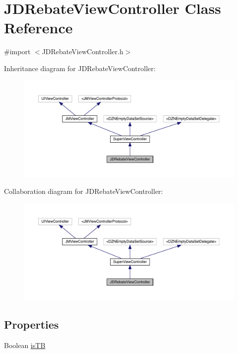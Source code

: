 \hypertarget{interface_j_d_rebate_view_controller}{}\section{J\+D\+Rebate\+View\+Controller Class Reference}
\label{interface_j_d_rebate_view_controller}


{\ttfamily \#import $<$J\+D\+Rebate\+View\+Controller.\+h$>$}



Inheritance diagram for J\+D\+Rebate\+View\+Controller\+:\nopagebreak
\begin{figure}[H]
\begin{center}
\leavevmode
\includegraphics[width=350pt]{interface_j_d_rebate_view_controller__inherit__graph}
\end{center}
\end{figure}


Collaboration diagram for J\+D\+Rebate\+View\+Controller\+:\nopagebreak
\begin{figure}[H]
\begin{center}
\leavevmode
\includegraphics[width=350pt]{interface_j_d_rebate_view_controller__coll__graph}
\end{center}
\end{figure}
\subsection*{Properties}
\begin{DoxyCompactItemize}
\item 
Boolean \mbox{\hyperlink{interface_j_d_rebate_view_controller_af36ed395a780a3e582bc646639161716}{is\+TB}}
\end{DoxyCompactItemize}
